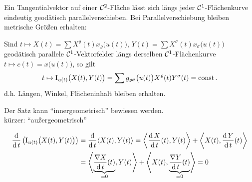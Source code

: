 \begin{folgerung}
 Ein Tangentialvektor auf einer \(\mathcal{C}^2\)-Fläche lässt sich längs jeder \(\mathcal{C}^1\)-Flächenkurve eindeutig geodätisch parallelverschieben. Bei Parallelverschiebung bleiben metrische Größen erhalten:
\end{folgerung}

\begin{satz}\label{satz221}
 Sind \(t \mapsto X(t) = \sum X^\varrho (t) x_\varrho\big(u(t)\big), \, Y(t) = \sum X^\sigma(t) x_\sigma \big(u(t)\big)\) geodätisch parallele \(\mathcal{C}^1\)-Vektorfelder längs derselben \(\mathcal{C}^1\)-Flächenkurve \(t \mapsto c(t) = x\big(u(t)\big)\), so gilt
 \begin{align*}
  t \mapsto \Rom 1_{u(t)}\big(X(t), Y(t)\big) = \sum g_{\varrho \sigma} \big(u(t)\big) X^\varrho(t) Y^\sigma(t) = \const.
 \end{align*}
d.h. Längen, Winkel, Flächeninhalt bleiben erhalten.
\end{satz}
Der Satz kann ``innergeometrisch'' bewiesen werden. \\
kürzer: ``außergeometrisch''

\begin{beweis}
 \begin{align*}
  \frac{\dd}{\dd t} \left( \Rom 1_{u(t)} \big( X(t), Y(t) \big)\right) &= \frac{\dd}{\dd t} \langle X(t), Y(t)\rangle = \left\langle \frac{\dd X}{\dd t}(t), Y(t) \right\rangle + \left\langle X(t), \frac{\dd Y}{\dd t}(t)\right\rangle \\
  &= \left\langle \underbrace{\frac{\nabla X}{\dd t} (t)}_{=0}, Y(t) \right\rangle + \left\langle X(t), \underbrace{\frac{\nabla Y}{\dd t}(t)}_{=0} \right\rangle =0
 \end{align*}

\end{beweis}

